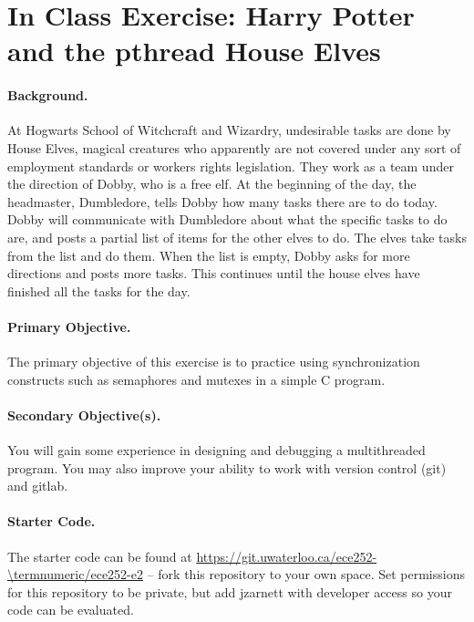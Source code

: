 




\section*{In Class Exercise: Harry Potter and the pthread House Elves}

\paragraph{Background.}
At Hogwarts School of Witchcraft and Wizardry, undesirable tasks are done by House
Elves, magical creatures who apparently are not covered under any sort of employment
standards or workers rights legislation. They work as a team under the direction of
Dobby, who is a free elf. At the beginning of the day, the headmaster, Dumbledore, tells Dobby how many tasks there are to do today. Dobby will communicate with Dumbledore about what the specific tasks to do are, and posts a partial list of items for the other elves to do. The elves take tasks from the list and do them. When the list is empty, Dobby asks for more directions and posts more tasks. This continues until the house elves have finished all the tasks for the day.

\paragraph{Primary Objective.} The primary objective of this exercise is to practice using synchronization constructs such as semaphores and mutexes in a simple C program.

\paragraph{Secondary Objective(s).} You will gain some experience in designing and debugging a multithreaded program. You may also improve your ability to work with version control (git) and gitlab.

\paragraph{Starter Code.} The starter code can be found at \url{https://git.uwaterloo.ca/ece252-\termnumeric/ece252-e2} -- fork this repository to your own space. Set permissions for this repository to be private, but add jzarnett with developer access so your code can be evaluated.

